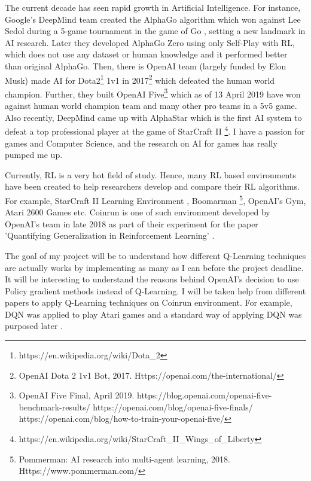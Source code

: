 \documentclass[10pt,twocolumn,letterpaper]{article}
\begin{document}
The current decade has seen rapid growth in Artificial Intelligence. For instance, Google's DeepMind team created the AlphaGo algorithm which won against Lee Sedol during a 5-game tournament in the game of Go \cite{silver_mastering_2016}, setting a new landmark in AI research. Later they developed AlphaGo Zero \cite{silver_mastering_2017} using only Self-Play with RL, which does not use any dataset or human knowledge and it performed better than original AlphaGo. Then, there is OpenAI team (largely funded by Elon Musk) made AI for Dota2\footnote{https://en.wikipedia.org/wiki/Dota\_2} 1v1 in 2017\footnote{OpenAI Dota 2 1v1 Bot, 2017. Https://openai.com/the-international/} which defeated the human world champion. Further, they built OpenAI Five\footnote{OpenAI Five Final, April 2019. https://blog.openai.com/openai-five-benchmark-results/ https://openai.com/blog/openai-five-finals/ https://openai.com/blog/how-to-train-your-openai-five/} which as of 13 April 2019 have won against human world champion team and many other pro teams in a 5v5 game. Also recently, DeepMind came up with AlphaStar \cite{arulkumaran_alphastar:_2019} which is the first AI system to defeat a top professional player at the game of StarCraft II \footnote{https://en.wikipedia.org/wiki/StarCraft\_II\:\_Wings\_of\_Liberty}. I have a passion for games and Computer Science, and the research on AI for games has really pumped me up. 

Currently, RL is a very hot field of study. Hence, many RL based environments have been created to help researchers develop and compare their RL algorithms. For example, StarCraft II Learning Environment \cite{vinyals_starcraft_2017}, Boomarman \footnote{Pommerman: AI research into multi-agent learning, 2018. Https://www.pommerman.com/}, OpenAI's Gym, Atari 2600 Games \cite{mnih_playing_2013,mnih_human-level_2015} etc. Coinrun is one of such environment developed by OpenAI's team in late 2018 as part of their experiment for the paper 'Quantifying Generalization in Reinforcement Learning' \cite{cobbe_quantifying_2018}. 

The goal of my project will be to understand how different Q-Learning techniques are actually works by implementing as many as I can before the project deadline. It will be interesting to understand the reasons behind OpenAI's decision to use Policy gradient methods instead of Q-Learning. I will be taken help from different papers to apply Q-Learning techniques on Coinrun environment. For example, DQN was applied to play Atari games \cite{mnih_human-level_2015} and a standard way of applying DQN was purposed later \cite{applyDQN}.
\end{document}

